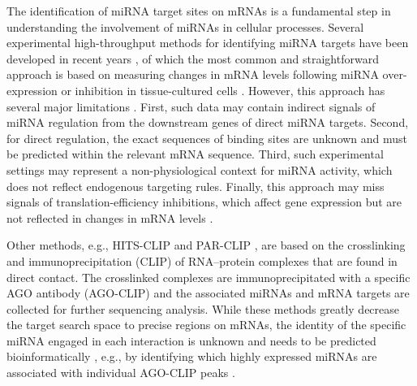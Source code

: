 \documentclass{bmcart}
\begin{document}
The identification of miRNA target sites on mRNAs is a fundamental step in understanding the involvement of miRNAs in cellular processes. Several experimental high-throughput methods for identifying miRNA targets have been developed in recent years \cite{li2019current, martinez2013microrna}, of which the most common and straightforward approach is based on measuring changes in mRNA levels following miRNA over-expression or inhibition in tissue-cultured cells \cite{thomas2010desperately}. However, this approach has several major limitations \cite{li2019current, martinez2013microrna}. First, such data may contain indirect signals of miRNA regulation from the downstream genes of direct miRNA targets. Second, for direct regulation, the exact sequences of binding sites are unknown and must be predicted within the relevant mRNA sequence. Third, such experimental settings may represent a non-physiological context for miRNA activity, which does not reflect endogenous targeting rules. Finally, this approach may miss signals of translation-efficiency inhibitions, which affect gene expression but are not reflected in changes in mRNA levels \cite{fabian2010regulation}.


Other methods, e.g., HITS-CLIP \cite{chi2009argonaute, zisoulis2010comprehensive} and PAR-CLIP \cite{hafner2010transcriptome}, are based on the crosslinking and immunoprecipitation (CLIP) of RNA--protein complexes that are found in direct contact. The crosslinked complexes are immunoprecipitated with a specific AGO antibody (AGO-CLIP) and the associated miRNAs and mRNA targets are collected for further sequencing analysis. While these methods greatly decrease the target search space to precise regions on mRNAs, the identity of the specific miRNA engaged in each interaction is unknown and needs to be predicted bioinformatically \cite{wang2015design, uhl2017computational}, e.g., by identifying which highly expressed miRNAs are associated with individual AGO-CLIP peaks \cite{majoros2013microrna, reczko2012functional, liu2013clip, khorshid2013biophysical}.
\end{document}
